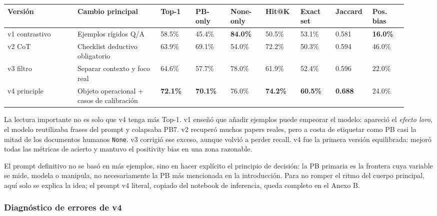 \begin{center}
\scriptsize
\setlength{\tabcolsep}{3pt}
\renewcommand{\arraystretch}{1.15}
\begin{tabular}{p{0.16\linewidth}p{0.19\linewidth}p{0.085\linewidth}p{0.085\linewidth}p{0.085\linewidth}p{0.085\linewidth}p{0.085\linewidth}p{0.08\linewidth}p{0.08\linewidth}}
\toprule
Versión & Cambio principal & Top-1 & PB-only & None-only & Hit@K & Exact set & Jaccard & Pos. bias \\
\midrule
v1 contrastivo & Ejemplos rígidos Q/A & 58.5\% & 45.4\% & \textbf{84.0\%} & 50.5\% & 53.1\% & 0.581 & \textbf{16.0\%} \\
v2 CoT & Checklist deductivo obligatorio & 63.9\% & 69.1\% & 54.0\% & 72.2\% & 50.3\% & 0.594 & 46.0\% \\
v3 filtro & Separar contexto y foco real & 64.6\% & 57.7\% & 78.0\% & 61.9\% & 52.4\% & 0.596 & 22.0\% \\
v4 principle & Objeto operacional + casos de calibración & \textbf{72.1\%} & \textbf{70.1\%} & 76.0\% & \textbf{74.2\%} & \textbf{60.5\%} & \textbf{0.688} & 24.0\% \\
\bottomrule
\end{tabular}
\end{center}

La lectura importante no es solo que v4 tenga más Top-1. v1 enseñó que añadir ejemplos puede empeorar el modelo: apareció el \emph{efecto loro}, el modelo reutilizaba frases del prompt y colapsaba PB7. v2 recuperó muchos papers reales, pero a costa de etiquetar como PB casi la mitad de los documentos humanos \texttt{None}. v3 corrigió ese exceso, aunque volvió a perder recall. v4 fue la primera versión equilibrada: mejoró todas las métricas de acierto y mantuvo el positivity bias en una zona razonable.


El prompt definitivo no se basó en más ejemplos, sino en hacer explícito el principio de decisión: la PB primaria es la frontera cuya variable se mide, modela o manipula, no necesariamente la PB más mencionada en la introducción. Para no romper el ritmo del cuerpo principal, aquí solo se explica la idea; el prompt v4 literal, copiado del notebook de inferencia, queda completo en el Anexo B.

\subsubsection{Diagnóstico de errores de v4}

